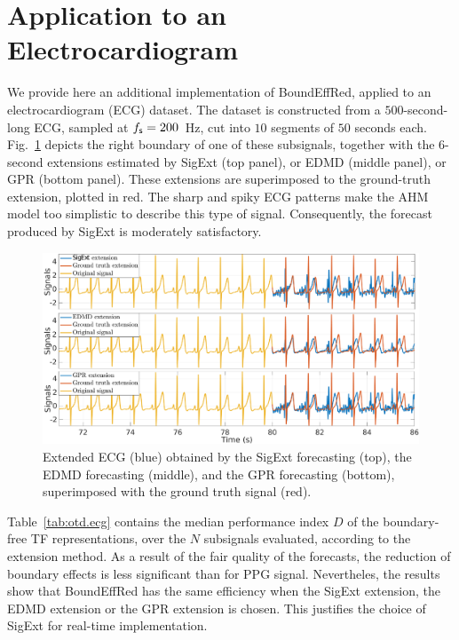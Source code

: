\documentclass[journal,onecolumn]{IEEEtran}
\begin{document}
\section{Application to an Electrocardiogram}
We provide here an additional implementation of {\sf BoundEffRed}, applied to an electrocardiogram (ECG) dataset. The dataset is constructed from a $500$-second-long ECG, sampled at $f_{\mathsf s}=200$~Hz, cut into $10$ segments of $50$ seconds each. Fig.~\ref{fig:ecg} depicts the right boundary of one of these subsignals, together with the $6$-second extensions estimated by {\sf SigExt} (top panel), or EDMD (middle panel), or GPR (bottom panel). These extensions are superimposed to the ground-truth extension, plotted in red. The sharp and spiky ECG patterns make the AHM model too simplistic to describe this type of signal. Consequently, the forecast produced by {\sf SigExt} is moderately satisfactory. 

\begin{figure}
\includegraphics[width=\textwidth]{ECGforecast.eps}
\caption{Extended ECG (blue) obtained by the {\sf SigExt} forecasting (top), the EDMD forecasting (middle), and the GPR forecasting (bottom), superimposed with the ground truth signal (red).}
\label{fig:ecg}
\end{figure}

Table~\ref{tab:otd.ecg} contains the median performance index $D$ of the boundary-free TF representations, over the $N$ subsignals evaluated, according to the extension method. As a result of the fair quality of the forecasts, the reduction of boundary effects is less significant than for PPG signal. Nevertheles, the results show that {\sf BoundEffRed} has the same efficiency when the {\sf SigExt} extension, the EDMD extension or the GPR extension is chosen. This justifies the choice of {\sf SigExt} for real-time implementation.
\end{document}

